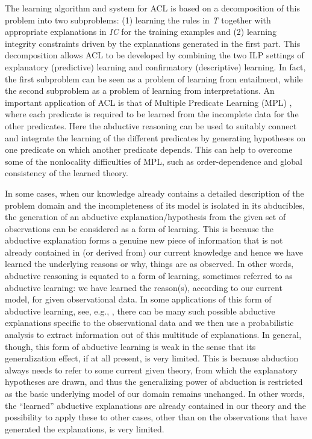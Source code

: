 The learning algorithm and system for ACL is based on a decomposition of this problem into two subproblems: (1) learning the rules in \textit{T} together with appropriate explanations in \textit{IC} for the training examples and (2) learning integrity constraints driven by the explanations generated in the first part. This decomposition allows ACL to be developed by combining the two ILP settings of explanatory (predictive) learning and confirmatory (descriptive) learning. In fact, the first subproblem can be seen as a problem of learning from entailment, while the second subproblem as a problem of learning from interpretations.
An important application of ACL is that of Multiple Predicate Learning (MPL) , where each predicate is required to be learned from the incomplete data for the other predicates. Here the abductive reasoning can be used to suitably connect and integrate the learning of the different predicates by generating hypotheses on one predicate on which another predicate depends. This can help to overcome some of the nonlocality difficulties of MPL, such as order-dependence and global consistency of the learned theory.

In some cases, when our knowledge already contains a detailed description of the problem domain and the incompleteness of its model is isolated in its abducibles, the generation of an abductive explanation/hypothesis from the given set of observations can be considered as a form of learning. This is because the abductive explanation forms a genuine new piece of information that is not already contained in (or derived from) our current knowledge and hence we have learned the underlying reasons or why, things are as observed. In other words, abductive reasoning is equated to a form of learning, sometimes referred to as abductive learning: we have learned the reason(s), according to our current model, for given observational data. In some applications of this form of abductive learning, see, e.g., , there can be many such possible abductive explanations specific to the observational data and we then use a probabilistic analysis to extract information out of this multitude of explanations.
In general, though, this form of abductive learning is weak in the sense that its generalization effect, if at all present, is very limited. This is because abduction always needs to refer to some current given theory, from which the explanatory hypotheses are drawn, and thus the generalizing power of abduction is restricted as the basic underlying model of our domain remains unchanged. In other words, the ``learned'' abductive explanations are already contained in our theory and the possibility to apply these to other cases, other than on the observations that have generated the explanations, is very limited.

